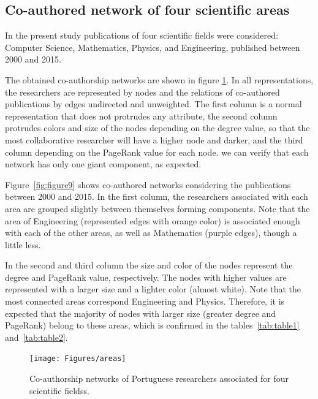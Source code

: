 \documentclass{article}
\begin{document}
\begin{multicols}{2}
\subsection{Co-authored network of four scientific areas}
	
In the present study publications of four scientific fields were considered: Computer Science, Mathematics, Physics, and Engineering, published between 2000 and 2015.

The obtained co-authorship networks are shown in figure \ref{fig:figure8}. In all representations, the researchers are represented by nodes and the relations of co-authored publications by edges undirected and unweighted. The first column is a normal representation that does not protrudes any attribute, the second column protrudes colors and size of the nodes depending on the degree value, so that the most collaborative researcher will have a higher node and darker, and the third column depending on the PageRank value for each node. we can verify that each network has only one giant component, as expected.

Figure~\ref{fig:figure9} shows co-authored networks considering the publications between 2000 and 2015. In the first column, the researchers associated with each area are grouped slightly between themselves forming components. Note that the area of Engineering (represented edges with orange color) is associated enough with each of the other areas, as well as Mathematics (purple edges), though a little less.

In the second and third column the size and color of the nodes represent the degree and PageRank value, respectively. The nodes with higher values are represented with a larger size and a lighter color (almost white). Note that the most connected areas correspond Engineering and Physics. Therefore, it is expected that the majority of nodes with larger size (greater degree and PageRank) belong to these areas, which is confirmed in the tables~\ref{tab:table1} and~\ref{tab:table2}.

\end{multicols}


\begin{figure}[h]
\centering
\texttt{[image: Figures/areas]}
\caption{Co-authorship networks of Portuguese researchers associated for four scientific fieldss.}
\label{fig:figure8}
\end{figure}


\pagebreak
\end{document}
